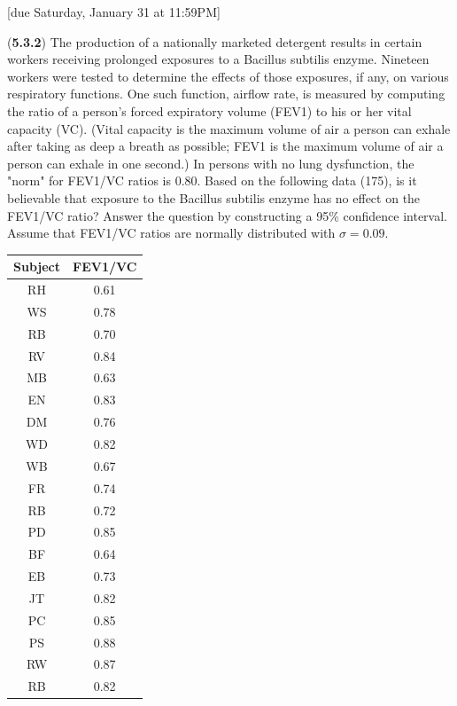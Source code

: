 \documentclass{article}
\begin{document}
[due Saturday, January 31 at 11:59PM]

\begin{probset}

\begin{prob}
    \begin{subprobset}
    \begin{subprob}
    (\textbf{5.3.2}) The production of a nationally marketed detergent results in certain workers receiving prolonged exposures to a Bacillus subtilis enzyme. Nineteen workers were tested to determine the effects of those exposures, if any, on various respiratory functions. One such function, airflow rate, is measured by computing the ratio of a person's forced expiratory volume (FEV1) to his or her vital capacity (VC). (Vital capacity is the maximum volume of air a person can exhale after taking as deep a breath as possible; FEV1 is the maximum volume of air a person can exhale in one second.) In persons with no lung dysfunction, the "norm" for FEV1/VC ratios is 0.80. Based on the following data (175), is it believable that exposure to the Bacillus subtilis enzyme has no effect on the FEV1/VC ratio? Answer the question by constructing a 95\% confidence interval. Assume that FEV1/VC ratios are normally distributed with $\sigma = 0.09$.

    \begin{center}
        \begin{tabular}{c|c}
            Subject & FEV1/VC \\
            \hline
            RH & 0.61 \\
            WS & 0.78 \\
            RB & 0.70 \\
            RV & 0.84 \\
            MB & 0.63 \\
            EN & 0.83 \\
            DM & 0.76 \\
            WD & 0.82 \\
            WB & 0.67 \\
            FR & 0.74 \\
            RB & 0.72 \\
            PD & 0.85 \\
            BF & 0.64 \\
            EB & 0.73 \\
            JT & 0.82 \\
            PC & 0.85 \\
            PS & 0.88 \\
            RW & 0.87 \\
            RB & 0.82 \\
        \end{tabular}
    \end{center}


\end{subprob}
\end{subprobset}
\end{prob}
\end{probset}
\end{document}
